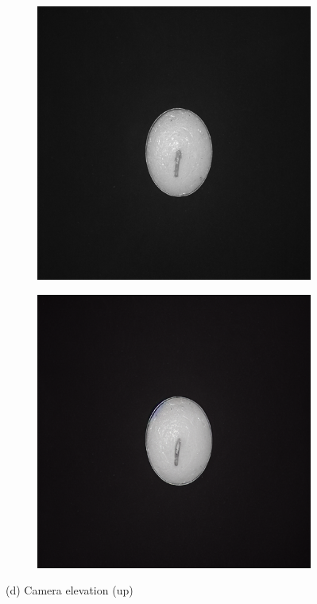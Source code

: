 \documentclass[12pt,DIV14,BCOR12mm,a4paper,footinclude=false,headinclude,parskip=half-,twoside,openright,cleardoublepage=empty,toc=index,bibliography=totoc,listof=totoc]{scrreprt}
\numberwithin{equation}{chapter}
\begin{document}
\begin{figure}
    \vspace{0.3cm} %

    \begin{subfigure}[t]{0.24\textwidth}
        \centering
        \includegraphics[width=\textwidth]{../media/diff_candles_up_real.png}
    \end{subfigure}%
    \hspace{0.02\textwidth}
    \begin{subfigure}[t]{0.24\textwidth}
        \centering
        \includegraphics[width=\textwidth]{../media/diff_candles_up_fake.png}
    \end{subfigure}
    \caption*{(d) Camera elevation (up)}


\end{figure}
\end{document}
